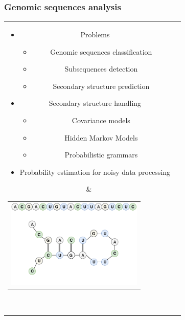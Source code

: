 \documentclass[xcolor=table]{beamer}
\begin{document}
\begin{frame} \frametitle{Genomic sequences analysis}
\begin{tabular}{cl}  
    \parbox{0.44\linewidth}{
        \begin{itemize}
            \item Problems
            \begin{itemize}
                \item Genomic sequences classification
                \item Subsequences detection
                \item Secondary structure prediction
            \end{itemize}
            \item Secondary structure handling
            \begin{itemize}
                \item Covariance models
                \item Hidden Markov Models
                \item Probabilistic grammars
            \end{itemize}
            \item Probability estimation for noisy data processing
        \end{itemize}
    }
    & \begin{tabular}{l}
            \vspace{-0.8cm}
            \hspace{-0.8cm}
            \includegraphics[width=6.5cm]{pictures/molekula.pdf}
         \end{tabular}  \\
\end{tabular}
\end{frame}
\end{document}

